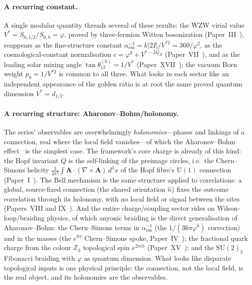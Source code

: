\documentclass[11pt,a4paper]{article}
\newcommand{\vp}{\varphi}
\newcommand{\ZZ}{\mathbb{Z}}
\newcommand{\aem}{\alpha_{\mathrm{em}}}
\begin{document}
\paragraph{A recurring constant.} A single modular quantity threads several
of these results: the WZW virial value $V^* = S_{0,1/2}/S_{0,0} = \vp$,
proved by three-fermion Witten bosonization (Paper~III~\cite{Paper3}),
reappears as the fine-structure constant $\aem^{-1} = k|2I|/V^{*2}
= 360/\vp^2$, as the cosmological-constant normalisation
$c = \vp^3 + V^{*-2Q_H}$ (Paper~VII~\cite{Paper7}), and as the leading
solar mixing angle $\tan\theta_{12}^{(0)} = 1/V^*$
(Paper~XVII~\cite{Paper17}); the vacuum Born weight $p_0 = 1/V^{*2}$ is
common to all three.  What looks in each sector like an independent
appearance of the golden ratio is at root the same proved quantum
dimension $V^* = d_{1/2}$.

\paragraph{A recurring structure: Aharonov--Bohm/holonomy.} The series'
observables are overwhelmingly \emph{holonomies}---phases and linkings of a
connection, real where the local field vanishes---of which the Aharonov--Bohm
effect~\cite{AharonovBohm1959} is the simplest case. The framework's core charge is already of this
kind: the Hopf invariant $Q$ is the self-linking of the preimage circles, i.e.\
the Chern--Simons helicity
$\tfrac{1}{4\pi^2}\!\int\!\mathbf{A}\cdot(\nabla\times\mathbf{A})\,d^3x$ of the
Hopf fibre's $\mathrm{U}(1)$ connection (Paper~I~\cite{Paper1}). The Bell
mechanism is the same structure applied to
correlations: a global, source-fixed connection (the shared orientation
$\hat n$) fixes the outcome correlation through its holonomy, with no local field
or signal between the sites (Papers~VIII and IX~\cite{Paper8,Paper9}). And the
entire charge/coupling sector rides on Wilson-loop/braiding physics, of which
anyonic braiding is the direct generalisation of Aharonov--Bohm: the
Chern--Simons terms in $\aem^{-1}$ (the $1/(36\pi\vp^6)$ correction) and in the
masses (the $e^{8\pi}$ Chern--Simons spoke, Paper~IV~\cite{Paper4}); the
fractional quark charge from the colour $\ZZ_3$ topological spin $e^{2\pi i h}$
(Paper~XV~\cite{Paper15}); and the $\mathrm{SU}(2)_3$ Fibonacci braiding with
$\vp$ as quantum dimension. What looks like disparate topological inputs is one
physical principle: the connection, not the local field, is the real object, and
its holonomies are the observables.
\end{document}
